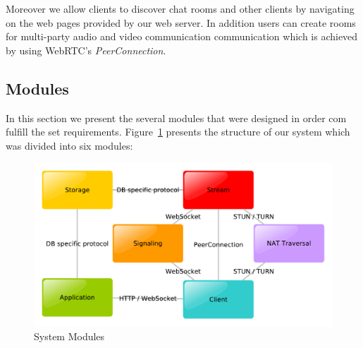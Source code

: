 \documentclass[conference,compsoc,a4paper]{IEEEtran}
\begin{document}
	Moreover we allow clients to discover chat rooms and other clients by navigating on the web pages provided by our web server. In addition users can create rooms for multi-party audio and video communication communication which is achieved by using \gls{WebRTC}'s \emph{PeerConnection}.
        
\subsection{Modules}
In this section we present the several modules that were designed in order com fulfill the set requirements.
	Figure~\ref{fig:modules} presents the structure of our system which was divided into six modules:


\begin{figure}
	\centering
	\includegraphics[width=\linewidth]{figures/modules.pdf}
	\caption{System Modules}
    \label{fig:modules}
\end{figure}
\end{document}
